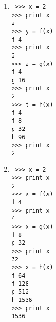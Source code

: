\begin{minipage}{7cm}
\begin{enumerate}
\item 

\begin{minipage}[t]{4cm}\tt
>>> x = 2\\
>>> print x\\
{\color{red}2}\\
>>> y = f(x)\\
{\color{red}f 4}\\
>>> print x\\
{\color{red}2}\\
>>> z = g(x)\\
{\color{red}f 4\\
g 16}\\
>>> print x\\
{\color{red}2}\\
>>> t = h(x)\\
{\color{red}f 4\\
f 8\\
g 32\\
h 96}\\
>>> print x\\
{\color{red}2}
\end{minipage}
\end{enumerate}
\end{minipage}
\hfill
\begin{minipage}{7cm}
\begin{enumerate}\setcounter{enumi}{1}

\item

\begin{minipage}[t]{4cm}\tt
>>> x = 2\\
>>> print x\\
{\color{red}2}\\
>>> x = f(x)\\
{\color{red}f 4}\\
>>> print x\\
{\color{red}4}\\
>>> x = g(x)\\
{\color{red}f 8\\
g 32}\\
>>> print x\\
{\color{red}32}\\
>>> x = h(x)\\
{\color{red}f 64\\
f 128\\
g 512\\
h 1536}\\
>>> print x\\
{\color{red}1536}
\end{minipage}

\end{enumerate}
\end{minipage}

